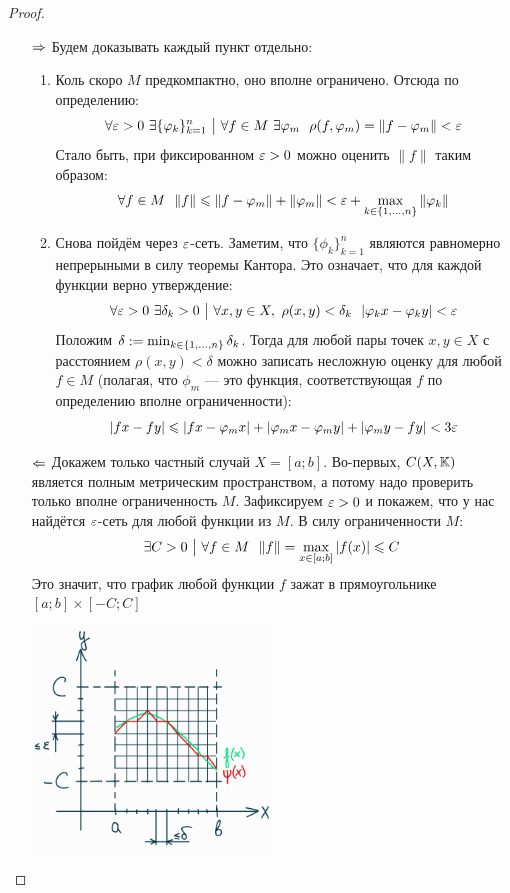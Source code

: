 \begin{proof}~
	\begin{itemize}
		\item[$\Rightarrow$] Будем доказывать каждый пункт отдельно:
		\begin{enumerate}
			\item Коль скоро $M$ предкомпактно, оно вполне ограничено. Отсюда по определению:
			\[
				\forall \varepsilon > 0\ \exists \{\varphi_k\}_{k = 1}^n \ \big|\  \forall f \in M\ \exists \varphi_m\ \ \rho(f, \varphi_m) = \|f - \varphi_m\| < \varepsilon
			\]
			Стало быть, при фиксированном $\varepsilon > 0$ можно оценить $\|f\|$ таким образом:
			\[
				\forall f \in M\ \ \|f\| \leqslant \|f - \varphi_m\| + \|\varphi_m\| < \varepsilon + \max_{k \in \{1, \ldots, n\}} \|\varphi_k\|
			\]
			
			\item Снова пойдём через $\varepsilon$-сеть. Заметим, что $\{\phi_k\}_{k = 1}^n$ являются равномерно непрерыными в силу теоремы Кантора. Это означает, что для каждой функции верно утверждение:
			\[
				\forall \varepsilon > 0\ \exists \delta_k > 0 \ \big|\  \forall x, y \in X,\ \rho(x, y) < \delta_k\ \ |\varphi_kx - \varphi_ky| < \varepsilon
			\]
			Положим $\delta := \min_{k \in \{1, \ldots, n\}} \delta_k$. Тогда для любой пары точек $x, y \in X$ с расстоянием $\rho(x, y) < \delta$ можно записать несложную оценку для любой $f \in M$ (полагая, что $\phi_m$ --- это функция, соответствующая $f$ по определению вполне ограниченности):
			\[
				|fx - fy| \leqslant |fx - \varphi_m x| + |\varphi_m x - \varphi_m y| + |\varphi_m y - fy| < 3\varepsilon
			\]
		\end{enumerate}
		
		\item[$\Leftarrow$] Докажем только частный случай $X = [a; b]$. Во-первых, $C(X, \mathbb{K})$ является полным метрическим пространством, а потому надо проверить только вполне ограниченность $M$. Зафиксируем $\varepsilon > 0$ и покажем, что у нас найдётся $\varepsilon$-сеть для любой функции из $M$. В силу ограниченности $M$:
		\[
			\exists C > 0 \such \forall f \in M\ \ \|f\| = \max_{x \in [a; b]} |f(x)| \le C
		\]
		Это значит, что график любой функции $f$ зажат в прямоугольнике $[a; b] \times [-C; C]$
		
		\begin{center}
			\includegraphics[width=0.5\textwidth]{images/5pic.png}
		\end{center}
		

\end{itemize}
\end{proof}
